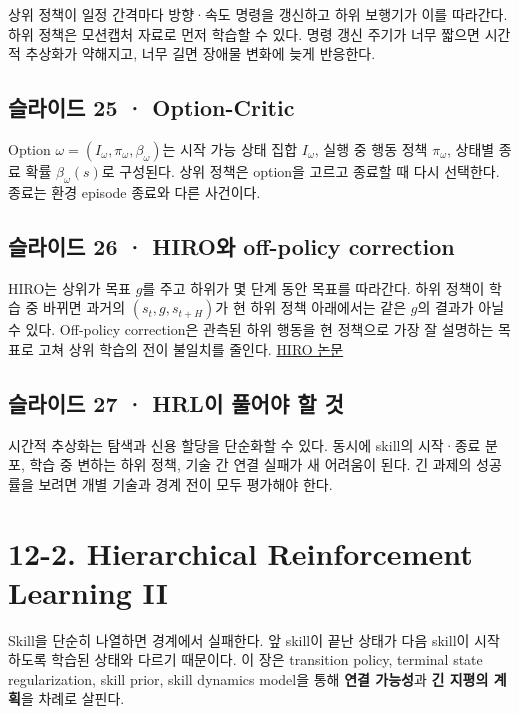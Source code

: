 \documentclass[11pt,a4paper]{article}
\begin{document}
상위 정책이 일정 간격마다 방향·속도 명령을 갱신하고 하위 보행기가 이를 따라간다. 하위 정책은 모션캡처 자료로 먼저 학습할 수 있다. 명령 갱신 주기가 너무 짧으면 시간적 추상화가 약해지고, 너무 길면 장애물 변화에 늦게 반응한다.\par

\subsection{슬라이드 25 · Option-Critic}

Option $\omega=(I_\omega,\pi_\omega,\beta_\omega)$는 시작 가능 상태 집합 $I_\omega$, 실행 중 행동 정책 $\pi_\omega$, 상태별 종료 확률 $\beta_\omega(s)$로 구성된다. 상위 정책은 option을 고르고 종료할 때 다시 선택한다. 종료는 환경 episode 종료와 다른 사건이다.\par

\subsection{슬라이드 26 · HIRO와 off-policy correction}

HIRO는 상위가 목표 $g$를 주고 하위가 몇 단계 동안 목표를 따라간다. 하위 정책이 학습 중 바뀌면 과거의 $(s_t,g,s_{t+H})$가 현 하위 정책 아래에서는 같은 $g$의 결과가 아닐 수 있다. Off-policy correction은 관측된 하위 행동을 현 정책으로 가장 잘 설명하는 목표로 고쳐 상위 학습의 전이 불일치를 줄인다. \href{https://arxiv.org/abs/1805.08296}{HIRO 논문}\par

\subsection{슬라이드 27 · HRL이 풀어야 할 것}

시간적 추상화는 탐색과 신용 할당을 단순화할 수 있다. 동시에 skill의 시작·종료 분포, 학습 중 변하는 하위 정책, 기술 간 연결 실패가 새 어려움이 된다. 긴 과제의 성공률을 보려면 개별 기술과 경계 전이 모두 평가해야 한다.\par

\clearpage
\section{12-2. Hierarchical Reinforcement Learning II}


Skill을 단순히 나열하면 경계에서 실패한다. 앞 skill이 끝난 상태가 다음 skill이 시작하도록 학습된 상태와 다르기 때문이다. 이 장은 transition policy, terminal state regularization, skill prior, skill dynamics model을 통해 \textbf{연결 가능성}과 \textbf{긴 지평의 계획}을 차례로 살핀다.\par
\end{document}
